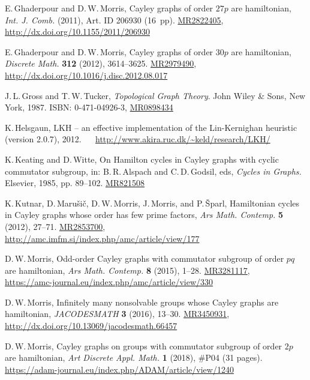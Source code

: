 \documentclass[]{amcjoucc}
\newcommand{\MR}[1]{\href{http://www.ams.org/mathscinet-getitem?mr=#1}{MR#1}}
\theoremstyle{plain}
\theoremstyle{definition}
\theoremstyle{definition}
\newcommand{\ZZ}{\mathbb{Z}}
\newcommand{\maynewline}{\hfil\ \penalty1000\hfilneg\ }
\begin{document}
\begin{thebibliography}{99}
E.\,Ghaderpour and D.\,W.\,Morris,
Cayley graphs of order $27p$ are hamiltonian,
\emph{ Int. J. Comb.} (2011), Art. ID 206930 (16~pp).
\MR{2822405},%
\maynewline
\url{http://dx.doi.org/10.1155/2011/206930}

E.\,Ghaderpour and D.\,W.\,Morris,
Cayley graphs of order $30p$ are hamiltonian,
\emph{Discrete Math.} \textbf{312} (2012), 3614--3625.
\MR{2979490},
\maynewline
 \url{http://dx.doi.org/10.1016/j.disc.2012.08.017}

J.\,L.\,Gross and T.\,W.\,Tucker,
\emph{ Topological Graph Theory}. 
John Wiley \& Sons, New York, 1987.
ISBN: 0-471-04926-3,
\MR{0898434}

K.\,Helsgaun,
LKH -- an effective implementation of the Lin-Kernighan heuristic (version 2.0.7), 2012.%
\maynewline
\url{http://www.akira.ruc.dk/~keld/research/LKH/}

K.\,Keating and D.\,Witte, 
On Hamilton cycles in Cayley graphs with cyclic commutator subgroup, 
in: B.\,R.\,Alspach and C.\,D.\,Godsil, eds, \emph{Cycles in Graphs.}
Elsevier, 1985, pp. 89--102. 
\MR{821508}

K.\,Kutnar, D.\,Maru\v si\v c, D.\,W.\,Morris, J.\,Morris, and P.\,\v Sparl,
Hamiltonian cycles in Cayley graphs whose order has few prime factors, 
\emph{Ars Math. Contemp.} \textbf{5} (2012), 27--71. 
\MR{2853700},%
\maynewline
\url{http://amc.imfm.si/index.php/amc/article/view/177}

D.\,W.\,Morris,
Odd-order Cayley graphs with commutator subgroup of order $pq$ are hamiltonian, 
\emph{Ars Math. Contemp.} \textbf{8} (2015), 1--28. 
\MR{3281117},%
\maynewline
\url{https://amc-journal.eu/index.php/amc/article/view/330}

D.\,W.\,Morris,
Infinitely many nonsolvable groups whose Cayley graphs are hamiltonian, 
\emph{JACODESMATH} \textbf{3} (2016), 13--30.
\MR{3450931},
\maynewline
\url{http://dx.doi.org/10.13069/jacodesmath.66457}

D.\,W.\,Morris,
Cayley graphs on groups with commutator subgroup of order $2p$ are hamiltonian,
\emph{Art Discrete Appl. Math.} \textbf{1} (2018), \#P04 (31 pages).%
\maynewline
\url{https://adam-journal.eu/index.php/ADAM/article/view/1240}



\end{thebibliography}
\end{document}
